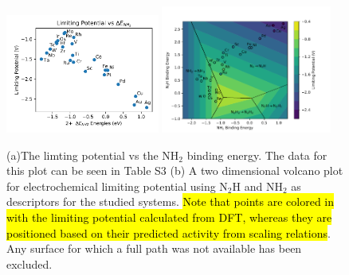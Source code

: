 \begin{figure}

    \centering
    \includegraphics[width=0.45\textwidth]{Images/NH2_v_limiting_pot.pdf}
    \includegraphics[width=0.5\textwidth]{Images/2d_scaling_plot.pdf}
    \caption{(a)The limting potential vs the NH$_2$ binding energy. The data for this plot can be seen in Table S3 (b) A two dimensional volcano plot for electrochemical limiting potential using N$_2$H and NH$_2$ as descriptors for the studied systems. \hl{Note that points are colored in with the limiting potential calculated from DFT, whereas they are positioned based on their predicted activity from scaling relations}. Any surface for which a full path was not available has been excluded.}
    \label{fig:2d_plot}
\end{figure}




